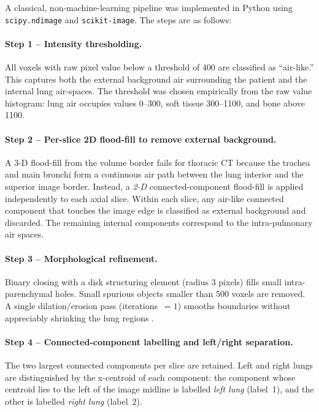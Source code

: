 \documentclass[11pt,a4paper]{article}
\begin{document}
A classical, non-machine-learning pipeline was implemented in Python using
\texttt{scipy.ndimage} and \texttt{scikit-image}. The steps are as follows:

\paragraph{Step 1 -- Intensity thresholding.}
All voxels with raw pixel value below a threshold of 400 are classified as
``air-like.'' This captures both the external background air surrounding the
patient and the internal lung air-spaces. The threshold was chosen empirically
from the raw value histogram: lung air occupies values 0--300, soft tissue
300--1100, and bone above 1100.

\paragraph{Step 2 -- Per-slice 2D flood-fill to remove external background.}
A 3-D flood-fill from the volume border fails for thoracic CT because the trachea
and main bronchi form a continuous air path between the lung interior and the
superior image border. Instead, a \emph{2-D} connected-component flood-fill is
applied independently to each axial slice. Within each slice, any air-like
connected component that touches the image edge is classified as external
background and discarded. The remaining internal components correspond to
the intra-pulmonary air spaces.

\paragraph{Step 3 -- Morphological refinement.}
Binary closing with a disk structuring element (radius 3 pixels) fills small
intra-parenchymal holes. Small spurious objects smaller than 500 voxels are
removed. A single dilation/erosion pass (iterations~$= 1$) smooths boundaries
without appreciably shrinking the lung regions \cite{gonzalez2018digital}.

\paragraph{Step 4 -- Connected-component labelling and left/right separation.}
The two largest connected components per slice are retained. Left and right lungs
are distinguished by the x-centroid of each component: the component whose
centroid lies to the left of the image midline is labelled \emph{left lung}
(label~1), and the other is labelled \emph{right lung} (label~2).
\end{document}
